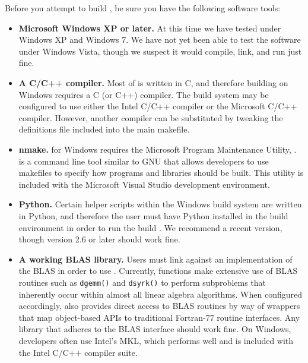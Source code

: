 Before you attempt to build \libflamens, be sure you have the following
software tools:
\begin{itemize}
\item
{\bf Microsoft Windows XP or later.}
At this time we have tested \libflame under Windows XP and Windows 7.
We have not yet been able to test the software under Windows Vista, though we
suspect it would compile, link, and run just fine.
\item
{\bf A C/C++ compiler.}
Most of \libflame is written in C, and therefore building \libflame on Windows
requires a C (or C++) compiler.
The build system may be configured to use either the Intel C/C++ compiler or
the Microsoft C/C++ compiler.
However, another compiler can be substituted by tweaking the definitions file
included into the main makefile.
\item
{\bf nmake.}
\libflame for Windows requires the Microsoft Program Maintenance Utility,
\nmakens.
\nmake is a command line tool similar to GNU \make that allows developers to
use makefiles to specify how programs and libraries should be built.
This utility is included with the Microsoft Visual Studio development
environment.
\item
{\bf Python.}
Certain helper scripts within the Windows build system are written in Python,
and therefore the user must have Python installed in the build environment
in order to run the build \libflamens.
We recommend a recent version, though version 2.6 or later should work fine.
\item
{\bf A working BLAS library.}
Users must link against an implementation of the BLAS in order
to use \libflamens.
Currently, \libflame functions make extensive use of BLAS routines such as
{\tt dgemm()} and {\tt dsyrk()} to perform subproblems that inherently
occur within almost all linear algebra algorithms.
When configured accordingly,
\libflame also provides direct access to BLAS routines by way of wrappers
that map object-based APIs to traditional Fortran-77 routine interfaces.
Any library that adheres to the BLAS interface should work fine.
On Windows, \libflame developers often use Intel's MKL, which performs well
and is included with the Intel C/C++ compiler suite.
\end{itemize}
